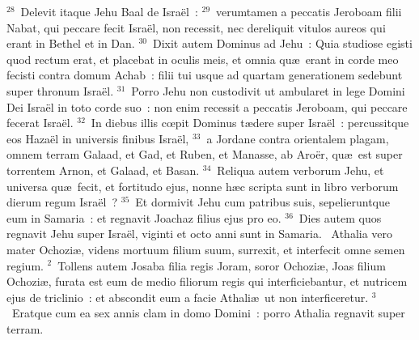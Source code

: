 ${}^{28}$~Delevit itaque Jehu Baal de Isra\"el~:
${}^{29}$~verumtamen a peccatis Jeroboam filii Nabat, qui peccare fecit Isra\"el, non recessit, nec dereliquit vitulos aureos qui erant in Bethel et in Dan.
${}^{30}$~Dixit autem Dominus ad Jehu~: Quia studiose egisti quod rectum erat, et placebat in oculis meis, et omnia qu\ae\ erant in corde meo fecisti contra domum Achab~: filii tui usque ad quartam generationem sedebunt super thronum Isra\"el.
${}^{31}$~Porro Jehu non custodivit ut ambularet in lege Domini Dei Isra\"el in toto corde suo~: non enim recessit a peccatis Jeroboam, qui peccare fecerat Isra\"el.
${}^{32}$~In diebus illis cœpit Dominus t\ae dere super Isra\"el~: percussitque eos Haza\"el in universis finibus Isra\"el,
${}^{33}$~a Jordane contra orientalem plagam, omnem terram Galaad, et Gad, et Ruben, et Manasse, ab Aro\"er, qu\ae\ est super torrentem Arnon, et Galaad, et Basan.
${}^{34}$~Reliqua autem verborum Jehu, et universa qu\ae\ fecit, et fortitudo ejus, nonne h\ae c scripta sunt in libro verborum dierum regum Isra\"el~?
${}^{35}$~Et dormivit Jehu cum patribus suis, sepelieruntque eum in Samaria~: et regnavit Joachaz filius ejus pro eo.
${}^{36}$~Dies autem quos regnavit Jehu super Isra\"el, viginti et octo anni sunt in Samaria.
~Athalia vero mater Ochozi\ae , videns mortuum filium suum, surrexit, et interfecit omne semen regium.
${}^{2}$~Tollens autem Josaba filia regis Joram, soror Ochozi\ae , Joas filium Ochozi\ae , furata est eum de medio filiorum regis qui interficiebantur, et nutricem ejus de triclinio~: et abscondit eum a facie Athali\ae\ ut non interficeretur.
${}^{3}$~Eratque cum ea sex annis clam in domo Domini~: porro Athalia regnavit super terram.


